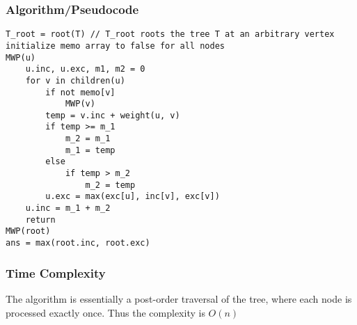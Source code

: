 \documentclass[11pt, fleqn]{article}
\begin{document}
\subsubsection*{Algorithm/Pseudocode}
\begin{verbatim}
T_root = root(T) // T_root roots the tree T at an arbitrary vertex
initialize memo array to false for all nodes
MWP(u)
    u.inc, u.exc, m1, m2 = 0
    for v in children(u)
        if not memo[v]
            MWP(v)
        temp = v.inc + weight(u, v)
        if temp >= m_1
            m_2 = m_1
            m_1 = temp
        else
            if temp > m_2
                m_2 = temp
        u.exc = max(exc[u], inc[v], exc[v])
    u.inc = m_1 + m_2
    return
MWP(root)
ans = max(root.inc, root.exc)
\end{verbatim}

\subsubsection*{Time Complexity}
The algorithm is essentially a post-order traversal of the tree, where each node is processed exactly once. Thus the complexity is $O(n)$ 



\end{document}
